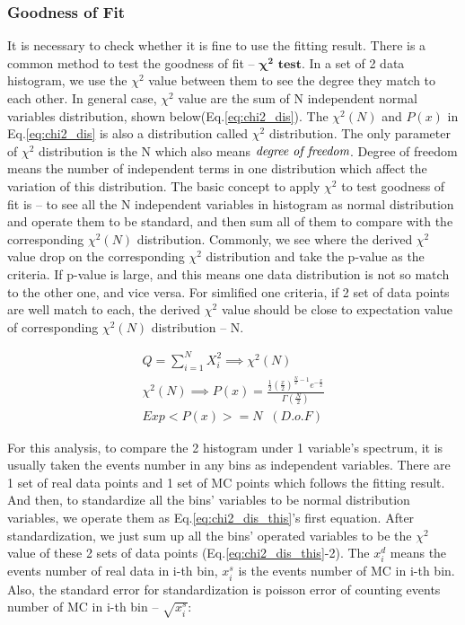 		\subsubsection{Goodness of Fit}
		\label{sssec:GoF}

		It is necessary to check whether it is fine to use the fitting result. There is a common method to test the goodness of fit -- $\boldsymbol{\chi^2}$ $\textbf{test}$. In a set of 2 data histogram, we use the $\chi^2$ value between them to see the degree they match to each other. In general case, $\chi^2$ value are the sum of N independent normal variables distribution, shown below(Eq.\ref{eq:chi2_dis}). The $\chi^2(N)$ and $P(x)$ in Eq.\ref{eq:chi2_dis} is also a distribution called $\chi^2$ distribution. The only parameter of $\chi^2$ distribution is the N which also means $\emph{degree of freedom}$. Degree of freedom means the number of independent terms in one distribution which affect the variation of this distribution. 
		The basic concept to apply $\chi^2$ to test goodness of fit is -- to see all the N independent variables in histogram as normal distribution and operate them to be standard, and then sum all of them to compare with the corresponding $\chi^2(N)$ distribution. Commonly, we see where the derived $\chi^2$ value drop on the corresponding $\chi^2$ distribution and take the p-value as the criteria. If p-value is large, and this means one data distribution is not so match to the other one, and vice versa. For simlified one criteria, if 2 set of data points are well match to each, the derived $\chi^2$ value should be close to expectation value of corresponding $\chi^2(N)$ distribution -- N.

		\begin{equation}
		\begin{split}
		Q = \sum_{i=1}^{N} X_i^2 \implies \chi^2(N) \\ %
		\chi^2(N) \implies P(x) = \frac{\frac{1}{2}(\frac{x}{2})^{\frac{N}{2} - 1}e^{-\frac{x}{2}}}{\Gamma (\frac{N}{2})} \\
		Exp<P(x)> = N \; \; (D.o.F)
		\label{eq:chi2_dis}
		\end{split}
		\end{equation}

		For this analysis, to compare the 2 histogram under 1 variable's spectrum, it is usually taken the events number in any bins as independent variables. There are 1 set of real data points and 1 set of MC points which follows the fitting result. And then, to standardize all the bins' variables to be normal distribution variables, we operate them as Eq.\ref{eq:chi2_dis_this}'s first equation. After standardization, we just sum up all the bins' operated variables to be the $\chi^2$ value of these 2 sets of data points (Eq.\ref{eq:chi2_dis_this}-2). The $x^d_i$ means the events number of real data in i-th bin, $x^s_i$ is the events number of MC in i-th bin. Also, the standard error for standardization is poisson error of counting events number of MC in i-th bin -- $\sqrt{x^s_i}$:

